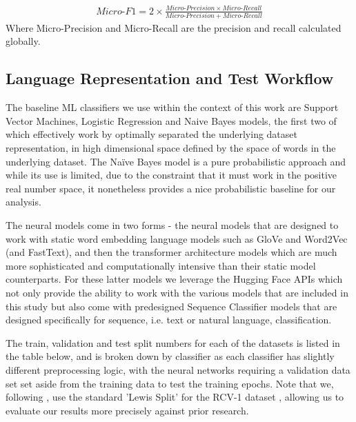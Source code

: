 \documentclass[final]{clv2025}
\begin{document}
\begin{align*}
    Micro\text{-}F1=2\times \frac{Micro \text{-}Precision\times Micro\text{-}Recall}{Micro\text{-}Precision+Micro\text{-}Recall}
\end{align*}
Where Micro-Precision and Micro-Recall are the precision and recall calculated globally.


\subsection{Language Representation and Test Workflow}
The baseline ML classifiers we use within the context of this work are Support Vector Machines, Logistic Regression and Naive Bayes models, the first two of which effectively work by optimally separated the underlying dataset representation, in high dimensional space defined by the space of words in the underlying dataset. The Naïve Bayes model is a pure probabilistic approach and while its use is limited, due to the constraint that it must work in the positive real number space, it nonetheless provides a nice probabilistic baseline for our analysis. 

The neural models come in two forms - the neural models that are designed to work with static word embedding language models such as GloVe and Word2Vec (and FastText), and then the transformer architecture models which are much more sophisticated and computationally intensive than their static model counterparts. For these latter models we leverage the Hugging Face APIs which not only provide the ability to work with the various models that are included in this study but also come with predesigned Sequence Classifier models that are designed specifically for sequence, i.e. text or natural language, classification.

The train, validation and test split numbers for each of the datasets is listed in the table below, and is broken down by classifier as each classifier has slightly different preprocessing logic, with the neural networks requiring a validation data set set aside from the training data to test the training epochs. Note that we, following \cite{moreo2021}, use the standard 'Lewis Split' for the RCV-1 dataset \cite{lewis2004}, allowing us to evaluate our results more precisely against prior research.
\end{document}
